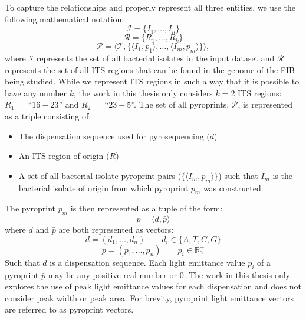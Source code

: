 \documentclass[12pt]{ucthesis}
\begin{document}
      To capture the relationships and properly represent all three entities,
      we use the following mathematical notation:
      $$\mathcal{I} = \{I_1, \ldots, I_n\}$$
      $$\mathcal{R} = \{R_1, \ldots, R_k\}$$
      $$\mathcal{P} = \langle \mathcal{T}, \{\langle I_1, p_1 \rangle, \ldots,
                      \langle I_m, p_m \rangle \} \rangle,$$
      where $\mathcal{I}$ represents the set of all bacterial isolates in the
      input dataset and $\mathcal{R}$ represents the set of all ITS regions
      that can be found in the genome of the FIB being studied. While we
      represent ITS regions in such a way that it is possible to have any
      number $k$, the work in this thesis only considers $k=2$ ITS regions:
      $R_1 =$ ``$16-23$'' and $R_2 =$ ``$23-5$''. The set of all pyroprints,
      $\mathcal{P}$, is represented as a triple consisting of:
      \begin{itemize}
         \item The dispensation sequence used for pyrosequencing ($d$)
         \item An ITS region of origin ($R$)
         \item A set of all bacterial isolate-pyroprint pairs ($\{\langle I_m,
               p_m\rangle\}$) such that $I_m$ is the bacterial isolate of
               origin from which pyroprint $p_m$ was constructed.
      \end{itemize}
      The pyroprint $p_m$ is then represented as a tuple of the form:
      $$p = \langle d, \bar{p}\rangle$$
      where $d$ and $\bar{p}$ are both represented as vectors:
      $$d = (d_1, \ldots, d_n) \qquad d_i \in \{A, T, C, G\}$$
      $$\bar{p} = (p_1, \ldots, p_n) \qquad p_i \in \mathds{R}_0^+$$
      Such that $d$ is a dispensation sequence. Each light emittance value
      $p_i$ of a pyroprint $\bar{p}$ may be any positive real number or $0$.
      The work in this thesis only explores the use of peak light emittance
      values for each dispensation and does not consider peak width or peak
      area. For brevity, pyroprint light emittance vectors are referred to as
      pyroprint vectors.
\end{document}
